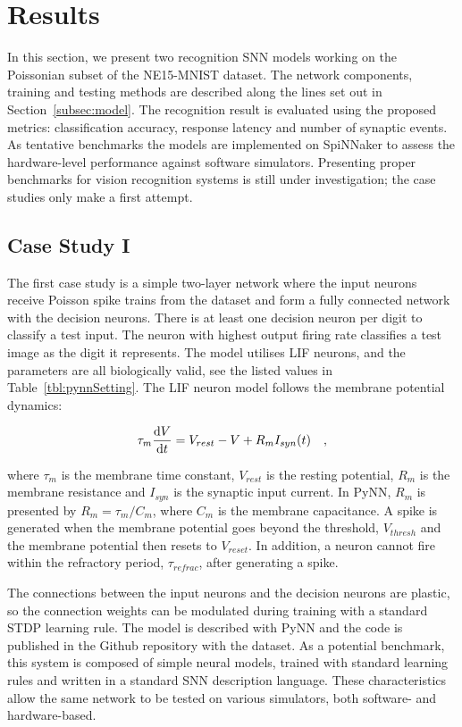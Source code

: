 \section{Results}
\label{sec:test}
In this section, we present two recognition SNN models working on the Poissonian subset of the NE15-MNIST dataset.
The network components, training and testing methods are described along the lines set out in Section~\ref{subsec:model}.
The recognition result is evaluated using the proposed metrics: classification accuracy, response latency and number of synaptic events.
As tentative benchmarks the models are implemented on SpiNNaker to assess the hardware-level performance against software simulators.
Presenting proper benchmarks for vision recognition systems is still under investigation; the case studies only make a first attempt.

\subsection{Case Study I}
The first case study is a simple two-layer network where the input neurons receive Poisson spike trains from the dataset and form a fully connected network with the decision neurons.
There is at least one decision neuron per digit to classify a test input.
The neuron with highest output firing rate classifies a test image as the digit it represents.
The model utilises LIF neurons, and the parameters are all biologically valid, see the listed values in Table~\ref{tbl:pynnSetting}.
The LIF neuron model follows the membrane potential dynamics:

\begin{equation}
\tau_m \frac{\mathrm{d} V}{\mathrm{d} t}=V_{rest} - V + R_{m} I_{syn}(t) ~~~,
\label{eq:LIF}
\end{equation}

where $\tau_m$ is the membrane time constant, $ V_{rest} $ is the resting potential, $ R_{m} $ is the membrane resistance and $ I_{syn} $ is the synaptic input current.
In PyNN, $ R_{m} $ is presented by $ R_{m}=\tau_m/C_{m} $, where $C_{m} $ is the membrane capacitance.
A spike is generated when the membrane potential goes beyond the threshold, $ V_{thresh} $ and the membrane potential then resets to $V_{reset}$.
In addition, a neuron cannot fire within the refractory period, $ \tau_{refrac} $, after generating a spike.

The connections between the input neurons and the decision neurons are plastic, so the connection weights can be modulated during training with a standard STDP learning rule.
The model is described with PyNN and the code is published in
the Github repository with the dataset.
As a potential benchmark, this system is composed of simple neural models, trained with standard learning rules and written in a standard SNN description language. These characteristics allow the same network to be tested on various simulators, both software- and hardware-based.

